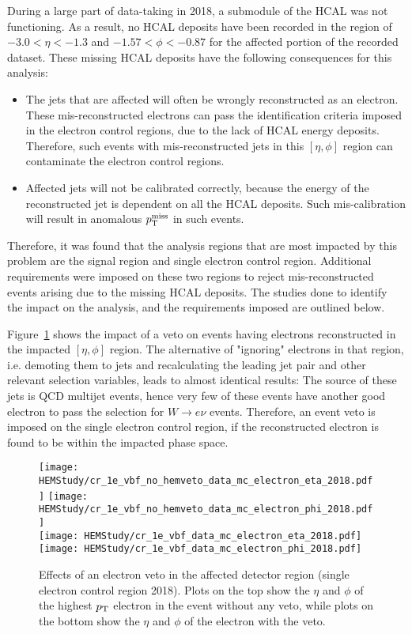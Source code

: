 During a large part of data-taking in 2018, a submodule of the HCAL was not
functioning. As a result, no HCAL deposits have been recorded in the region of
$-3.0 < \eta < -1.3$ and $-1.57 < \phi < -0.87$ for the affected portion of the
recorded dataset. These missing HCAL deposits have the following consequences
for this analysis:

\begin{itemize}
    \item The jets that are affected will often be wrongly reconstructed as an electron. These mis-reconstructed
    electrons can pass the identification criteria imposed in the electron control regions, due
    to the lack of HCAL energy deposits. Therefore, such events with mis-reconstructed jets in
    this $[\eta,\phi]$ region can contaminate the electron control regions.
    \item Affected jets will not be calibrated correctly, because the energy of the reconstructed jet
    is dependent on all the HCAL deposits. Such mis-calibration will result in anomalous $p_{\textrm{T}}^{\textrm{miss}}$ in such events. 
\end{itemize}

Therefore, it was found that the analysis regions that are most impacted by this problem are the signal region and single 
electron control region. Additional requirements were imposed on these two regions to reject mis-reconstructed events arising
due to the missing HCAL deposits. The studies done to identify the impact on the analysis, and the requirements imposed are
outlined below. 

Figure~\ref{fig:HEM_motivation} shows the impact of a veto on 
events having electrons reconstructed in the impacted $[\eta,\phi]$ region. 
The alternative of "ignoring" electrons in that region, i.e. demoting them to jets 
and recalculating the leading jet pair and other relevant selection variables, 
leads to almost identical results: The source of these jets is QCD multijet events, 
hence very few of these events have another good electron to pass the selection for 
$W \rightarrow e \nu$ events. Therefore, an event veto is imposed on the single electron
control region, if the reconstructed electron is found to be within the impacted phase space.

\begin{figure}[htbp]
    \begin{center}
        \texttt{[image: HEMStudy/cr\_1e\_vbf\_no\_hemveto\_data\_mc\_electron\_eta\_2018.pdf]}
        \texttt{[image: HEMStudy/cr\_1e\_vbf\_no\_hemveto\_data\_mc\_electron\_phi\_2018.pdf]} \\
        \texttt{[image: HEMStudy/cr\_1e\_vbf\_data\_mc\_electron\_eta\_2018.pdf]}
        \texttt{[image: HEMStudy/cr\_1e\_vbf\_data\_mc\_electron\_phi\_2018.pdf]}
    \end{center}
    \caption{Effects of an electron veto in the affected detector region (single electron control region 2018). 
    Plots on the top show the $\eta$ and $\phi$ of the highest $p_{\textrm{T}}$ electron in the event
    without any veto, while plots on the bottom show the $\eta$ and $\phi$ of the electron with the veto.}
    \label{fig:HEM_motivation}
\end{figure}

